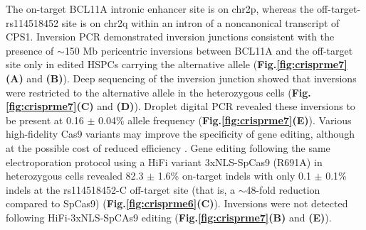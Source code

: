 \documentclass[a4paper, titlepage, openright]{book}
\begin{document}
The on-target BCL11A intronic enhancer site is on chr2p, whereas the off-target-rs114518452 site is on chr2q within an intron of a noncanonical transcript of CPS1. Inversion PCR demonstrated inversion junctions consistent with the presence of $\sim$150 Mb pericentric inversions between BCL11A and the off-target site only in edited HSPCs carrying the alternative allele (\textbf{Fig.\ref{fig:crisprme7}(A)} and \textbf{(B)}). Deep sequencing of the inversion junction showed that inversions were restricted to the alternative allele in the heterozygous cells (\textbf{Fig.\ref{fig:crisprme7}(C)} and \textbf{(D)}). Droplet digital PCR revealed these inversions to be present at 0.16 $\pm$ 0.04\% allele frequency (\textbf{Fig.\ref{fig:crisprme7}(E)}). Various high-fidelity Cas9 variants may improve the specificity of gene editing, although at the possible cost of reduced efficiency \citep{schmid2020highly}. Gene editing following the same electroporation protocol using a HiFi variant 3xNLS-SpCas9 (R691A) \citep{vakulskas2018high} in heterozygous cells revealed 82.3 $\pm$ 1.6\% on-target indels with only 0.1 $\pm$ 0.1\% indels at the rs114518452-C off-target site (that is, a $\sim$48-fold reduction compared to SpCas9) (\textbf{Fig.\ref{fig:crisprme6}(C)}). Inversions were not detected following HiFi-3xNLS-SpCAs9 editing (\textbf{Fig.\ref{fig:crisprme7}(B)} and \textbf{(E)}).
\end{document}

